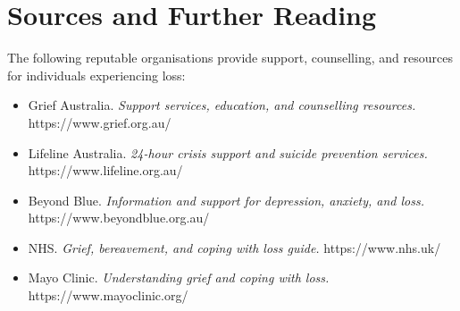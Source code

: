 \section*{Sources and Further Reading}
The following reputable organisations provide support, counselling, and resources for individuals experiencing loss:
\begin{itemize}
    \item Grief Australia. \textit{Support services, education, and counselling resources.} https://www.grief.org.au/
    \item Lifeline Australia. \textit{24-hour crisis support and suicide prevention services.} https://www.lifeline.org.au/
    \item Beyond Blue. \textit{Information and support for depression, anxiety, and loss.} https://www.beyondblue.org.au/
    \item NHS. \textit{Grief, bereavement, and coping with loss guide.} https://www.nhs.uk/
    \item Mayo Clinic. \textit{Understanding grief and coping with loss.} https://www.mayoclinic.org/
\end{itemize}
